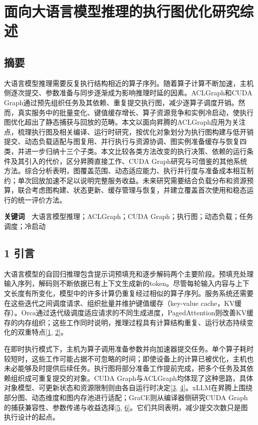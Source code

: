 \documentclass[UTF8,11pt,fontset=windows]{ctexart}
\begin{document}
\hypertarget{paper-title}{%
\section{\texorpdfstring{\textbf{面向大语言模型推理的执行图优化研究综述}}{面向大语言模型推理的执行图优化研究综述}}\label{paper-title}}

\hypertarget{abstract}{%
\subsection{\texorpdfstring{\textbf{摘要}}{摘要}}\label{abstract}}

大语言模型推理需要反复执行结构相近的算子序列。随着算子计算不断加速，主机侧逐次提交、参数准备与同步逐渐成为影响推理时延的因素。ACLGraph和CUDA Graph通过预先组织任务及其依赖、重复提交执行图，减少逐算子调度开销。然而，真实服务中的批量变化、键值缓存增长、算子资源竞争和实例冷启动，使执行图优化超出了静态捕获与回放的范畴。本文以面向昇腾的ACLGraph应用为关注点，梳理执行图及相关编译、运行时研究，按优化对象划分为执行图构建与低开销提交、动态负载适配与图复用、并行执行与资源协调、图实例准备缓存与恢复四类，并进一步归纳十三个子类。本文比较各类方法改变的执行决策、依赖的运行条件及其引入的代价，区分昇腾直接工作、CUDA Graph研究与可借鉴的其他系统方法。综合分析表明，图覆盖范围、动态适应能力、执行并行度与准备成本相互制约；单次回放加速不足以说明完整服务收益。未来研究需要结合负载分布和资源预算，联合考虑图构建、状态更新、缓存管理与恢复，并建立覆盖首次使用和稳态运行的统一评价方法。

\textbf{关键词}　大语言模型推理；ACLGraph；CUDA Graph；执行图；动态负载；任务调度；冷启动

\hypertarget{section-1}{%
\subsection{\texorpdfstring{\textbf{1 引言}}{1 引言}}\label{section-1}}

大语言模型的自回归推理包含提示词预填充和逐步解码两个主要阶段。预填充处理输入序列，解码则不断依据已有上下文生成新的token。尽管每轮输入内容与上下文长度有所变化，模型中的许多计算仍重复经过相似的算子序列。服务系统还需要在这些迭代之间调度请求、组织批量并维护键值缓存（key-value cache，KV缓存）。Orca通过迭代级调度适应请求的不同生成进度，PagedAttention则改善KV缓存的内存组织；这些工作同时说明，推理过程具有计算结构重复、运行状态持续变化的双重特点\protect\hyperlink{ref-1}{{[}1}, \protect\hyperlink{ref-2}{2{]}}。

在即时执行模式下，主机为算子调用准备参数并向加速器提交任务。单个算子耗时较短时，这些工作可能占据不可忽略的时间；即使设备上的计算已被优化，主机也未必能够及时提供后续任务。执行图将部分准备工作提前完成，把多个任务及其依赖组织成可重复提交的对象。CUDA Graph与ACLGraph均体现了这种思路，具体对象模型、可更新状态和资源限制则由各自运行时决定\protect\hyperlink{ref-3}{{[}3}, \protect\hyperlink{ref-4}{4{]}}。xLLM在昇腾上围绕部分图、动态维度和图内存池进行适配；GraCE则从编译器侧研究CUDA Graph的捕获兼容性、参数传递与收益选择\protect\hyperlink{ref-5}{{[}5}, \protect\hyperlink{ref-6}{6{]}}。它们共同表明，减少提交次数只是图执行设计的起点。
\end{document}
